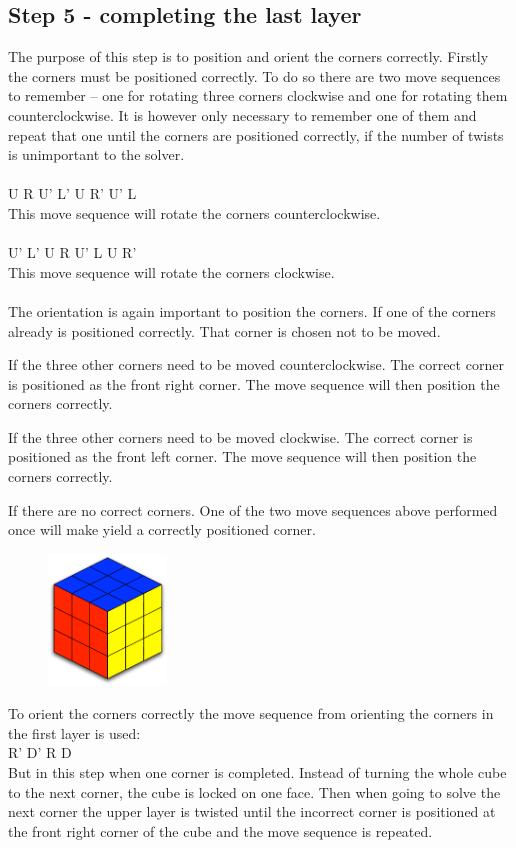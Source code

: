 \subsection{Step 5 - completing the last layer}\label{sub:step5}
The purpose of this step is to position and orient the corners correctly. Firstly the corners must be positioned correctly. To do so there are two move sequences to remember -- one for rotating three corners clockwise and one for rotating them counterclockwise. It is however only necessary to remember one of them and repeat that one until the corners are positioned correctly, if the number of twists is unimportant to the solver. \\
\\
U R U' L' U R' U' L
\\
This move sequence will rotate the corners counterclockwise.
\\
\\
U' L' U R U' L U R'
\\
This move sequence will rotate the corners clockwise.
\\
\\
The orientation is again important to position the corners. If one of the corners already is positioned correctly. That corner is chosen not to be moved. 

If the three other corners need to be moved counterclockwise. The correct corner is positioned as the front right corner. The move sequence will then position the corners correctly.

If the three other corners need to be moved clockwise. The correct corner is positioned as the front left corner. The move sequence will then position the corners correctly.

If there are no correct corners. One of the two move sequences above performed once will make yield a correctly positioned corner.

\begin{figure}
\begin{center}
	\includegraphics[width=0.28\textwidth]{input/pics/8done}	
\end{center}
\caption{}
\label{fig:8done}
\end{figure}

To orient the corners correctly the move sequence from orienting the corners in the first layer is used: \\

R' D' R D \\

But in this step when one corner is completed. Instead of turning the whole cube to the next corner, the cube is locked on one face. Then when going to solve the next corner the upper layer is twisted until the incorrect corner is positioned at the front right corner of the cube and the move sequence is repeated.